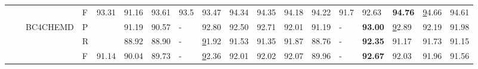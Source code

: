 \documentclass[nocrop]{bioinfo}
\begin{document}
\begin{landscape}
\begin{table}[]
\begin{tabular}{@{}lllllllllllllllllll@{}}
                                         & \multicolumn{2}{l}{}                              &                                  & F       & 93.31          & \multicolumn{1}{l|}{91.16}       & 93.61 & 93.5       & 93.47          & 94.34                                                                      & 94.35                                                               & \multicolumn{1}{l|}{94.18}                                                            & 94.22       & 91.7          & 92.63          & \textbf{94.76}                                                             & {\ul 94.66}                                                         & 94.61                                                            \\
                                         & \multicolumn{2}{l}{}                              & \multirow{3}{*}{BC4CHEMD}        & P       &                & \multicolumn{1}{l|}{91.19}       & 90.57 & -          & 92.80          & 92.50                                                                      & 92.71                                                               & \multicolumn{1}{l|}{92.01}                                                            & 91.19       & -             & \textbf{93.00} & {\ul 92.89}                                                                & 92.19                                                               & 91.98                                                            \\
                                         & \multicolumn{2}{l}{}                              &                                  & R       &                & \multicolumn{1}{l|}{88.92}       & 88.90 & -          & {\ul 91.92}    & 91.53                                                                      & 91.35                                                               & \multicolumn{1}{l|}{91.87}                                                            & 88.76       & -             & \textbf{92.35} & 91.17                                                                      & 91.73                                                               & 91.15                                                            \\
                                         & \multicolumn{2}{l}{}                              &                                  & F       & 91.14          & \multicolumn{1}{l|}{90.04}       & 89.73 & -          & {\ul 92.36}    & 92.01                                                                      & 92.02                                                               & \multicolumn{1}{l|}{92.07}                                                            & 89.96       & -             & \textbf{92.67} & 92.03                                                                      & 91.96                                                               & 91.56                                                            \\ \cmidrule(l){2-19} 

\end{tabular}
\end{table}
\end{landscape}
\end{document}
